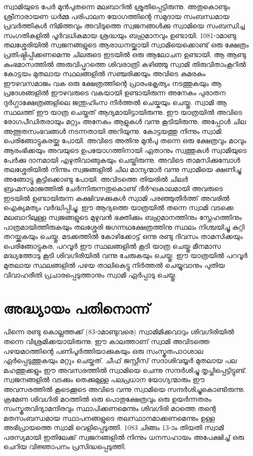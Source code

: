 \documentclass[12pt,openany]{book}
\begin{document}
	സ്വാമിയുടെ പേർ മുൻപുതന്നെ മലബാറിൽ ശ്രുതിപ്പെട്ടിരുന്നു. അതുകൊണ്ടും ശ്രീനാരായണ ധർമ്മ പരിപാലന യോഗത്തിന്റെ സമുദായ സംബന്ധമായ പ്രവർത്തികൾ നിമിത്തവും അവിടുത്തെ സ്വജനങ്ങൾക്കു സ്വാമിയെ സംബന്ധിച്ച സംഗതികളിൽ പൂർവധികമായ ശ്രദ്ധയും ബഹുമാനവും ഉണ്ടായി. 1081-ാമാണ്ടു തലശ്ശേരിയിൽ സ്വജനങ്ങളുടെ ആരാധനയ്ക്കായി സ്വാമിയെക്കൊണ്ട് ഒരു ക്ഷേത്രം പ്രതിഷ്ഠിപ്പിക്കണമെന്നു ചിലരുടെ ഇടയിൽ ഒരു ആലോചന ഉണ്ടായി. ആ ആണ്ടു കുംഭമാസത്തിൽ അരുവിപ്പുറത്തെ ശിവരാത്രി കഴിഞ്ഞു സ്വാമി തിരുവിതാംകൂറിൽ കോട്ടയം മുതലായ സ്ഥലങ്ങളിൽ സഞ്ചരിക്കയും അവിടെ കുമരകം ഈഴവസമാജം വക ഒരു ക്ഷേത്രത്തിന്റെ പ്രാരംഭകൃത്യം നടത്തുകയും ആ പ്രദേശങ്ങളിൽ ഈഴവരുടെ വകയായി ഉണ്ടായിരുന്ന അനേകം പുരാതന ദുർഗ്ഗാക്ഷേത്രങ്ങളിലെ ജന്തുഹിംസ നിർത്തൽ ചെയ്കയും ചെയ്തു. സ്വാമി ആ സ്ഥലത്ത് ഈ യാത്ര ചെയ്തത് ആദ്യമായിട്ടായിരുന്നു. ഈ യാത്രയിൽ അവിടെ രോഗപീഡിതരായും മറ്റും അനേകം ആളുകൾ വന്നു കൂടിയിരുന്നു. അപ്പോൾ ചില അത്ഭുതസംഭവങ്ങൾ നടന്നതായി അറിയുന്നു. കോട്ടയത്തു നിന്നും സ്വാമി പെരിങ്ങോട്ടുകരയ്ക്കു പോയി. അവിടെ അതിനു മുൻപു തന്നെ ഒരു ക്ഷേത്രവും മഠവും ആരംഭിക്കയും അവയുടെ ഉപയോഗത്തിനായി ഏതാനും സ്വത്തുകൾ സ്വാമിയുടെ പേർക്കു ദാനമായി എഴുതിവാങ്ങുകയും ചെയ്തിരുന്നു. അവിടെ താമസിക്കുമ്പോൾ തലശ്ശേരിയിൽ നിന്നും സ്വജങ്ങളിൽ ചില മാന്യന്മാർ വന്നു സ്വാമിയെ ക്ഷണിച്ചു അങ്ങോട്ടു കൂട്ടിക്കൊണ്ടു പോയി. അവിടത്തെ തിയരിൽ ചിലർ ബ്രഹ്മസമാജത്തിൽ ചേർന്നിരുന്നതുകൊണ്ട് ദീർഘകാലമായി അവരുടെ ഇടയിൽ ഉണ്ടായിരുന്ന കക്ഷിവഴക്കുകൾ സ്വാമി പരഞ്ഞുതീർത്ത് അവരിൽ ഐക്യമത്യം വർദ്ധിപ്പിച്ചു. ഈ ആദ്യത്തെ യാത്രയിൽ തന്നെ സ്വാമി വടക്കെ മലബാറിലുള്ള സ്വജങ്ങളുടെ മുഴുവൻ ഭക്തിക്കും ബഹുമാനത്തിനും സ്നേഹത്തിനും പാത്രമായിത്തീരുകയും തലശ്ശേരി ജഗന്നഥക്ഷേത്രത്തിനു സ്ഥലം നിശ്ചയിച്ചു കുറ്റി തറയ്ക്കുകയും ചെയ്തു. മടക്കത്തിൽ കോഴിക്കോട്ട് ഒന്നു രണ്ടു ദിവസം താമസിക്കയും പെരിങ്ങോട്ടുകര, പറവൂർ ഈ സ്ഥലങ്ങളിൽ കൂടി യാത്ര ചെയ്തു മീനമാസ മദ്ധ്യത്തോടു കൂടി ശിവഗിരിയിൽ വന്നു ചേരുകയും ചെയ്തു. ഈ യാത്രയിൽ പറവൂർ മുതലായ സ്ഥലങ്ങളിൽ പഴയ താലികെട്ടു നിർത്തൽ ചെയ്യുവാനും പുതിയ വിവാഹരീതി പ്രചാരപ്പെടുത്താനും സ്വാമി ഏർപ്പാടു ചെയ്തു.
	
	\newpage
	\chapter*{അദ്ധ്യായം പതിനൊന്ന്}
	
	പിന്നെ രണ്ടു കൊല്ലത്തക്ക് (83-ാമാണ്ടുവരെ) സ്വാമിമിക്കവാറും ശിവഗിരിയിൽ തന്നെ വിശ്രമിക്കയായിരുന്നു. ഈ കാലത്താണ് സ്വാമി അവിടത്തെ പഴയമഠത്തിന്റെ പണിപൂർത്തിയാക്കുകയും ഒരു സംസ്കൃതപാഠശാല ഏർപ്പെടുത്തുകയും മറ്റും ചെയ്തത്. ചീഫ് ജസ്റ്റീസ് സദാശിവയ്യർ മുതലായ പല മഹത്തുക്കളും ഈ അവസരത്തിൽ സ്വാമിയെ ചെന്നു സന്ദർശിച്ചു തൃപ്തിപ്പെട്ടിട്ടുണ്ട്. സ്വജനങ്ങളിൽ വടക്കും തെക്കുമുള്ള പലപ്രധാന യോഗ്യന്മാരും ഈ അവസരത്തിൽ കൂടെക്കൂടെ അവിടെ വന്നു സ്വാമിയെ സന്ദർശിച്ചുകൊണ്ടിരുന്നു. ക്രമേണ ശിവഗിരി മഠത്തിൽ ഒരു പൊതുക്ഷേത്രവും ഒരു ഉയർന്നതരം സംസ്കൃതവിദ്യാമന്ദിരവും സ്ഥാപിക്കണമെന്നും ശിവഗിരി മഠത്തെ തന്റെ മതസംബന്ധമായ സ്ഥാപനങ്ങളുടെ തലസ്ഥാനമാക്കണമെന്നും ഉള്ള അഭിപ്രായത്തെ സ്വാമി വെളിപ്പെടുത്തി. 1083 ചിങ്ങം 13-ാം തിയതി സ്വാമി പരസ്യമായി ഇതിലേക്ക് സ്വജനങ്ങളിൽ നിന്നും ധനസഹായം അപേക്ഷിച്ച് ഒരു ചെറിയ വിജ്ഞാപനം പ്രസിദ്ധപ്പെടുത്തി.
	
\end{document}

